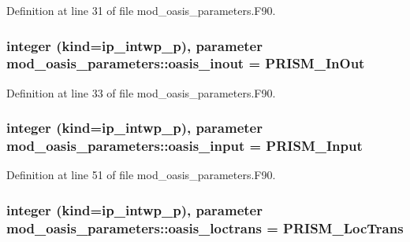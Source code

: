 Definition at line 31 of file mod\+\_\+oasis\+\_\+parameters.\+F90.

\hypertarget{classmod__oasis__parameters_adc22f0871027f573ac705ca4593519f0}{
\subsubsection[{oasis\+\_\+inout}]{\setlength{\rightskip}{0pt plus 5cm}integer (kind=ip\+\_\+intwp\+\_\+p), parameter mod\+\_\+oasis\+\_\+parameters\+::oasis\+\_\+inout = P\+R\+I\+S\+M\+\_\+\+In\+Out}}\label{classmod__oasis__parameters_adc22f0871027f573ac705ca4593519f0}


Definition at line 33 of file mod\+\_\+oasis\+\_\+parameters.\+F90.

\hypertarget{classmod__oasis__parameters_ae65ca856d776de249fc624b2d76bc4e8}{
\subsubsection[{oasis\+\_\+input}]{\setlength{\rightskip}{0pt plus 5cm}integer (kind=ip\+\_\+intwp\+\_\+p), parameter mod\+\_\+oasis\+\_\+parameters\+::oasis\+\_\+input = P\+R\+I\+S\+M\+\_\+\+Input}}\label{classmod__oasis__parameters_ae65ca856d776de249fc624b2d76bc4e8}


Definition at line 51 of file mod\+\_\+oasis\+\_\+parameters.\+F90.

\hypertarget{classmod__oasis__parameters_a8b206cc178182e3526d400ea7a6587b5}{
\subsubsection[{oasis\+\_\+loctrans}]{\setlength{\rightskip}{0pt plus 5cm}integer (kind=ip\+\_\+intwp\+\_\+p), parameter mod\+\_\+oasis\+\_\+parameters\+::oasis\+\_\+loctrans = P\+R\+I\+S\+M\+\_\+\+Loc\+Trans}}\label{classmod__oasis__parameters_a8b206cc178182e3526d400ea7a6587b5}


